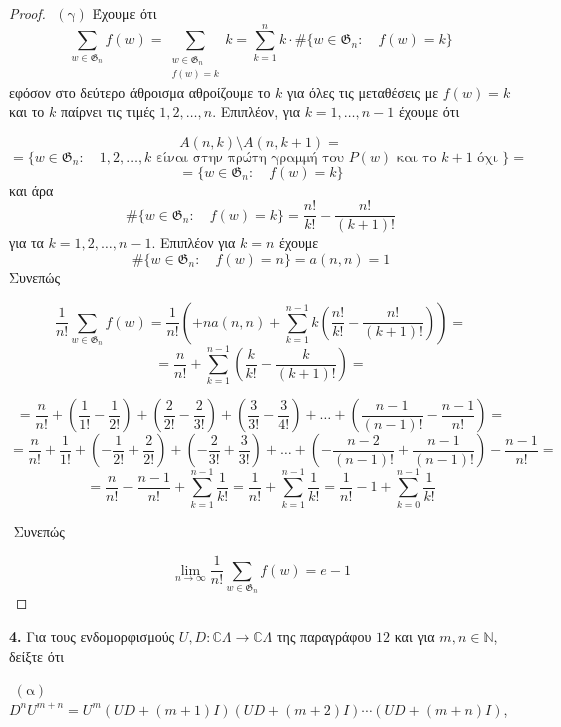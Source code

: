 \documentclass[oneside,a4paper]{article}
\begin{document}
\begin{proof}
    $ $\newline
    $(\text{γ} )$ Έχουμε ότι 
    $$\sum\limits_{w \in \mathfrak{G}_n} f(w) = \sum\limits_{\substack{w \in \mathfrak{G}_n \\ f(w) = k}} k = \sum\limits_{k=1}^n k \cdot  \# \{ w\in \mathfrak{G}_n: \quad f(w) = k \}$$ εφόσον στο δεύτερο άθροισμα αθροίζουμε το $k$ για όλες τις μεταθέσεις με $f(w)=k$ και το $k$ παίρνει τις τιμές $1,2,\ldots,n$. Επιπλέον, για $k=1,\ldots,n-1$ έχουμε ότι

    $$A(n,k)\setminus A(n,k+1)  = $$
    $$ = \{ w \in \mathfrak{G}_n: \quad 1,2,\ldots,k \text{ είναι στην πρώτη γραμμή του } P(w) \text{ και το } k+1 \text{ όχι }\}  = $$
    $$ = \{ w\in \mathfrak{G}_n: \quad f(w) = k \}$$ και άρα $$\# \{ w\in \mathfrak{G}_n: \quad f(w) = k \} = \frac{n!}{k!} - \frac{n!}{(k+1)!} $$ για τα $k=1,2,\ldots,n-1$. Επιπλέον για $k=n$ έχουμε $$\# \{w \in \mathfrak{G}_n: \quad f(w) = n\} = a(n,n) = 1$$ Συνεπώς

    $$\frac{1}{n!} \sum\limits_{w \in \mathfrak{G}_n} f(w) = \frac{1}{n!} \left( + na(n,n) + \sum\limits_{k=1}^{n-1} k\left(\frac{n!}{k!} - \frac{n!}{(k+1)!} \right)\right) = $$
    $$= \frac{n}{n!} + \sum\limits_{k=1}^{n-1} \left(\frac{k}{k!} - \frac{k}{(k+1)!} \right)= $$
    
    $$ = \frac{n}{n!} + \left(\frac{1}{1!} - \frac{1}{2!} \right) + \left(\frac{2}{2!} - \frac{2}{3!}\right) + \left(\frac{3}{3!} - \frac{3}{4!}\right) + \ldots + \left(\frac{n-1}{(n-1)!} - \frac{n-1}{n!}\right) = $$
    $$ = \frac{n}{n!} + \frac{1}{1!} + \left(- \frac{1}{2!} + \frac{2}{2!}\right) + \left(- \frac{2}{3!} + \frac{3}{3!} \right)  + \ldots + \left(-\frac{n-2}{(n-1)!} + \frac{n-1}{(n-1)!}\right) - \frac{n-1}{n!} = $$
    $$ = \frac{n}{n!} - \frac{n-1}{n!} + \sum\limits_{k=1}^{n-1} \frac{1}{k!} = \frac{1}{n!} + \sum\limits_{k=1}^{n-1} \frac{1}{k!} = \frac{1}{n!} -1 + \sum\limits_{k=0}^{n-1} \frac{1}{k!} $$

    $ $\newline
    Συνεπώς

    $$\lim_{n\to \infty } \frac{1}{n!} \sum\limits_{w\in \mathfrak{G}_n}f(w) = e-1$$
\end{proof}
\pagebreak


\noindent \textbf{4. } Για τους ενδομορφισμούς $U,D : \mathbb{C}\Lambda \rightarrow \mathbb{C}\Lambda$ της παραγράφου $12$ και για $m,n \in \mathbb{N}$, δείξτε ότι

$ $\newline
$(\text{α} )$ $D^n U^{m+n} = U^m (UD + (m+1)I)(UD + (m+2)I)\cdots(UD + (m+n)I)$,
\end{document}
